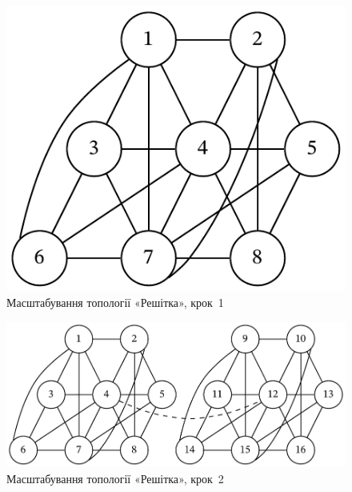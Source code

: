 \documentclass[
	a4paper,
	oneside,
	BCOR = 10mm,
	DIV = 12,
	12pt,
	headings = normal,
]{scrartcl}
\begin{document}
				\begin{figure}[!htbp]
					\centering
					\includegraphics[height=7\baselineskip]{./assets/cluster-08-01-named.pdf}
					\caption{Масштабування топології «Решітка», крок~1}
					\label{fig:cluster-08-05-grid-s01}
				\end{figure}

				\begin{figure}[!htbp]
					\centering
					\includegraphics[height=6\baselineskip]{./assets/cluster-08-05-grid-s02.pdf}
					\caption{Масштабування топології «Решітка», крок~2}
					\label{fig:cluster-08-05-grid-s02}
				\end{figure}
\end{document}
